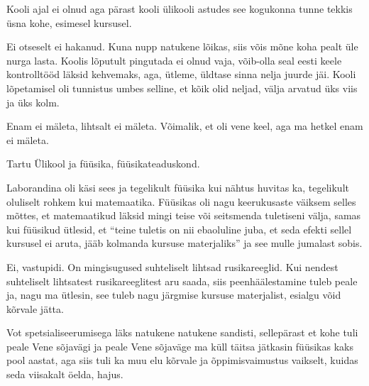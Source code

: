 
Kooli ajal ei olnud aga pärast kooli ülikooli astudes see kogukonna tunne tekkis üsna kohe, esimesel kursusel.


Ei otseselt ei hakanud. Kuna nupp natukene lõikas, siis võis mõne koha pealt üle nurga lasta. Koolis lõputult pingutada ei olnud vaja, võib-olla seal eesti keele kontrolltööd läksid kehvemaks, aga, ütleme, üldtase sinna nelja juurde jäi. Kooli lõpetamisel oli tunnistus umbes selline, et kõik olid neljad, välja arvatud üks viis ja üks kolm. 


Enam ei mäleta, lihtsalt ei mäleta. Võimalik, et oli vene keel, aga ma hetkel enam ei mäleta.


Tartu Ülikool ja füüsika, füüsikateaduskond.


Laborandina oli käsi sees ja tegelikult füüsika kui nähtus huvitas ka, tegelikult oluliselt rohkem kui matemaatika. Füüsikas oli nagu keerukusaste väiksem selles mõttes, et matemaatikud läksid mingi teise või seitsmenda tuletiseni välja, samas kui füüsikud ütlesid, et \enquote{teine tuletis on nii ebaoluline juba, et seda efekti sellel kursusel ei aruta, jääb kolmanda kursuse materjaliks} ja see mulle jumalast sobis.


Ei, vastupidi. On mingisugused suhteliselt lihtsad rusikareeglid. Kui nendest suhteliselt lihtsatest rusikareeglitest aru saada, siis peenhäälestamine  tuleb peale ja, nagu ma ütlesin, see tuleb nagu järgmise kursuse materjalist,  esialgu võid kõrvale jätta.


Vot spetsialiseerumisega läks natukene natukene sandisti, sellepärast et kohe tuli peale Vene sõjavägi ja peale Vene sõjaväge ma küll täitsa jätkasin füüsikas kaks pool aastat, aga siis tuli ka muu elu kõrvale ja õppimisvaimustus vaikselt, kuidas seda viisakalt öelda, hajus.

